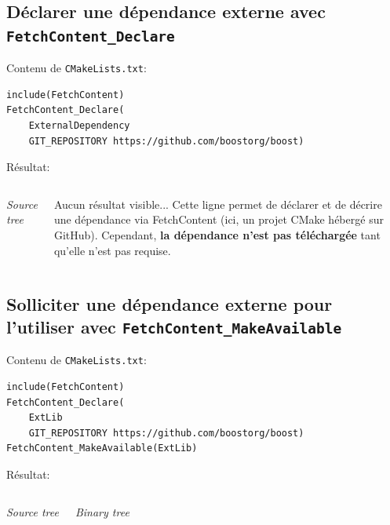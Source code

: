 \documentclass{beamer}
\newenvironment{Frame}{\begin{frame}[containsverbatim]{\subsecname}}{\end{frame}}
\begin{document}
\subsection{Déclarer une dépendance externe avec \texttt{FetchContent\_Declare}}

\begin{Frame}
    \setlength{\DTbaselineskip}{1em}
    Contenu de \texttt{CMakeLists.txt}:
    
    \begin{verbatim}
include(FetchContent)
FetchContent_Declare(
    ExternalDependency
    GIT_REPOSITORY https://github.com/boostorg/boost)
    \end{verbatim}

    Résultat:
    \begin{columns}
        \begin{center}   
            \textit{Source tree}
        \end{center}

        \footnotesize
        Aucun résultat visible... Cette ligne permet de déclarer et de décrire une dépendance via FetchContent (ici, un projet CMake hébergé sur GitHub). Cependant, \textbf{la dépendance n'est pas téléchargée} tant qu'elle n'est pas requise.
    \end{columns}
\end{Frame}

\subsection{Solliciter une dépendance externe pour l'utiliser avec \texttt{FetchContent\_MakeAvailable}}

\begin{Frame}
    \setlength{\DTbaselineskip}{0.5em}
    Contenu de \texttt{CMakeLists.txt}:
    
    \begin{verbatim}
include(FetchContent)
FetchContent_Declare(
    ExtLib
    GIT_REPOSITORY https://github.com/boostorg/boost)
FetchContent_MakeAvailable(ExtLib)
    \end{verbatim}

    Résultat:
    \begin{columns}
        \begin{center}   
            \textit{Source tree}
        \end{center}

        \begin{center}   
            \textit{Binary tree}
        \end{center}
        \footnotesize
    \end{columns}
\end{Frame}
\end{document}
